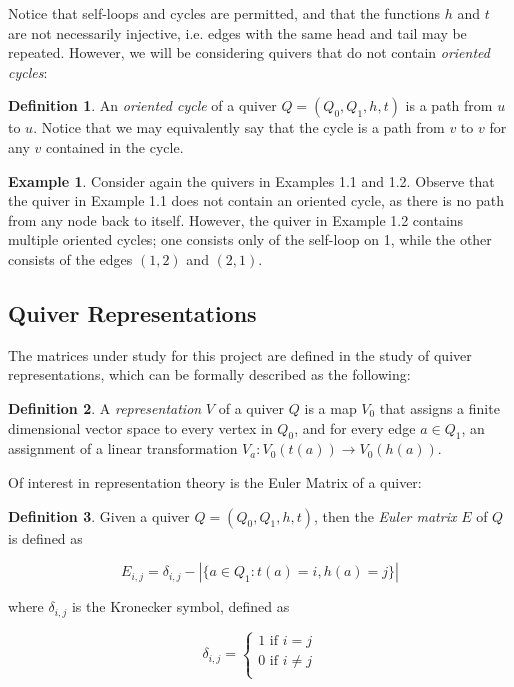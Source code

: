 \documentclass{amsart}
\theoremstyle{theorem}
\theoremstyle{theorem*}
\theoremstyle{definition}
\newtheorem{example}[theorem]{Example}
\newtheorem{definition}{Definition}
\begin{document}
Notice that self-loops and cycles are permitted, and that the functions $h$ and
$t$ are not necessarily injective, i.e. edges with the same head and tail may be
repeated. However, we will be considering quivers that do not contain
\textit{oriented cycles}:

\begin{definition} \cite{dw} An \textit{oriented cycle} of a quiver $Q = (Q_0,
        Q_1, h, t)$ is a path from $u$ to $u$. Notice that we may equivalently
    say that the cycle is a path from $v$ to $v$ for any $v$ contained in
    the cycle.
\end{definition}

\begin{example}
    Consider again the quivers in Examples 1.1 and 1.2. Observe that the quiver
    in Example 1.1 does not contain an oriented cycle, as there is no path from
    any node back to itself. However, the quiver in Example 1.2 contains multiple
    oriented cycles; one consists only of the self-loop on 1, while the other
    consists of the edges $(1,2)$ and $(2,1)$.
\end{example}

\subsection{Quiver Representations}

The matrices under study for this project are defined in the study of quiver
representations, which can be formally described as the following:

\begin{definition} \cite{dw} A \textit{representation} $V$ of a quiver $Q$ is a
    map $V_0$ that assigns a finite dimensional vector space to every vertex in
    $Q_0$, and for every edge $a \in Q_1$, an assignment of a linear
    transformation $V_a : V_0(t(a)) \rightarrow V_0(h(a))$.
\end{definition}

Of interest in representation theory is the Euler Matrix of a quiver:

\begin{definition} \cite{dw} Given a quiver $Q = (Q_0, Q_1, h, t)$, then the
    \textit{Euler matrix} $E$ of $Q$ is defined as

    $$E_{i,j} = \delta_{i,j} - |\{a \in Q_1 : t(a) = i, h(a) = j \}|$$

    where $\delta_{i,j}$ is the Kronecker symbol, defined as

    $$\delta_{i,j} = \begin{cases} 1 \text{ if } i = j \\ 0 \text{ if } i \neq j
            \\\end{cases}$$

\end{definition}
\end{document}
